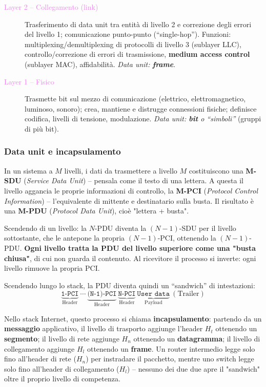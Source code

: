 \documentclass[12pt, a4paper]{article}
\begin{document}
\begin{description}
    \item[\textcolor{violet}{Layer 2 -- Collegamento (link)}] Trasferimento di data unit tra entità di livello 2 e correzione degli errori del livello 1; comunicazione punto-punto (``single-hop''). Funzioni: multiplexing/demultiplexing di protocolli di livello 3 (sublayer LLC), controllo/correzione di errori di trasmissione, \textbf{medium access control} (sublayer MAC), affidabilità. \textit{Data unit: \textbf{frame}}.
    \item[\textcolor{violet}{Layer 1 -- Fisico}] Trasmette bit sul mezzo di comunicazione (elettrico, elettromagnetico, luminoso, sonoro); crea, mantiene e distrugge connessioni fisiche; definisce codifica, livelli di tensione, modulazione. \textit{Data unit: \textbf{bit} o ``simboli''} (gruppi di più bit).
\end{description}

\subsubsection{Data unit e incapsulamento}

\begin{tcolorbox}[colback=lightergray!10, colframe=tocsec, title=\textbf{SDU, PCI, PDU}]
In un sistema a $M$ livelli, i dati da trasmettere a livello $M$ costituiscono una \textbf{M-SDU} (\textit{Service Data Unit}) -- pensala come il testo di una lettera. A questa il livello aggancia le proprie informazioni di controllo, la \textbf{M-PCI} (\textit{Protocol Control Information}) -- l'equivalente di mittente e destinatario sulla busta. Il risultato è una \textbf{M-PDU} (\textit{Protocol Data Unit}), cioè "lettera + busta".

Scendendo di un livello: la $N$-PDU diventa la $(N{-}1)$-SDU per il livello sottostante, che le antepone la propria $(N{-}1)$-PCI, ottenendo la $(N{-}1)$-PDU. \textbf{Ogni livello tratta la PDU del livello superiore come una "busta chiusa"}, di cui non guarda il contenuto. Al ricevitore il processo si inverte: ogni livello rimuove la propria PCI.
\end{tcolorbox}

Scendendo lungo lo stack, la PDU diventa quindi un ``sandwich'' di intestazioni:
$$\underbrace{\texttt{1-PCI}}_{\text{Header}} \ \cdots\ \underbrace{\texttt{(N-1)-PCI}}_{\text{Header}}\ \underbrace{\texttt{N-PCI}}_{\text{Header}}\ \underbrace{\texttt{User data}}_{\text{Payload}}\ (\text{Trailer})$$

Nello stack Internet, questo processo si chiama \textbf{incapsulamento}: partendo da un \textbf{messaggio} applicativo, il livello di trasporto aggiunge l'header $H_t$ ottenendo un \textbf{segmento}; il livello di rete aggiunge $H_n$ ottenendo un \textbf{datagramma}; il livello di collegamento aggiunge $H_l$ ottenendo un \textbf{frame}. Un router intermedio legge solo fino all'header di rete ($H_n$) per instradare il pacchetto, mentre uno switch legge solo fino all'header di collegamento ($H_l$) -- nessuno dei due due apre il "sandwich" oltre il proprio livello di competenza.
\end{document}
